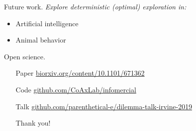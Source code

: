 \documentclass[10pt]{beamer}
\begin{document}
\begin{frame}[fragile]{Future work.}
\textit{Explore deterministic (optimal) exploration in:}
\begin{itemize}
    \item Artificial intelligence
    \item Animal behavior
\end{itemize}
\end{frame}

\begin{frame}[fragile]{Open science.}
\begin{itemize}
\item[Paper] \url{biorxiv.org/content/10.1101/671362}
\item[Code] \url{github.com/CoAxLab/infomercial}
\item[Talk] \url{github.com/parenthetical-e/dilemma-talk-irvine-2019}
\item[] 
\item[] \alert{Thank you!}
\end{itemize}
\end{frame}
\end{document}

